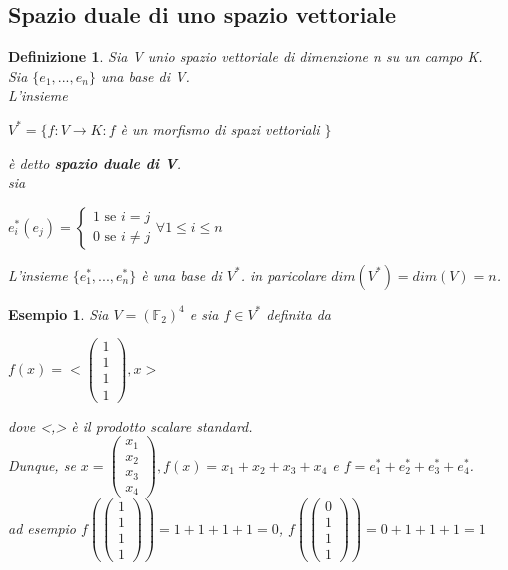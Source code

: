 \documentclass[a4paper,12pt]{article}
\theoremstyle{def}
\newtheorem*{definition}{Definizione}
\theoremstyle{prop}
\theoremstyle{esempio}
\newtheorem*{example}{Esempio}
\theoremstyle{dimostrazione}
\theoremstyle{teo}
\theoremstyle{osservazione}
\begin{document}
\newpage
\subsection{Spazio duale di uno spazio vettoriale}
\begin{definition}
	Sia V unio spazio vettoriale di dimenzione n su un campo K.\\
	Sia \(\{e_1, ..., e_n\}\) una base di V.\\
	L'insieme
	\begin{center}
		\(V^* = \{f : V \rightarrow K : f\) è un morfismo di spazi vettoriali \(\}\)\\
	\end{center}
	è detto \textbf{spazio duale di V}.\\
	sia
	\begin{center}
		\(e^*_i(e_j)= \begin{cases}
			1 \text{ se } i = j \\
			0 \text{ se } i \neq j
		\end{cases} \forall 1 \leq i \leq n\)
	\end{center}
	L'insieme \(\{e^*_1, ..., e^*_n\}\) è una base di \(V^*\). in paricolare \(dim(V^*) = dim(V) = n\).\\
\end{definition}

\begin{example}
	Sia \(V = (\mathbb{F}_2)^4\) e sia \(f \in V^*\) definita da
	\begin{center}
		\(f(x) = <\begin{pmatrix}
			1 \\
			1 \\
			1 \\
			1
		\end{pmatrix}, x >\)
	\end{center}
	dove <,> è il prodotto scalare standard.\\
	Dunque, se \(x = \begin{pmatrix}
		x_1 \\
		x_2 \\
		x_3 \\
		x_4
	\end{pmatrix}, f(x) = x_1 + x_2 + x_3 + x_4\) e \(f = e^*_1 + e^*_2 + e^*_3 + e^*_4\).\\
	ad esempio \(f(\begin{pmatrix}
		1 \\
		1 \\
		1 \\
		1
	\end{pmatrix}) = 1 + 1 + 1 + 1 = 0\),
	\(f(\begin{pmatrix}
		0 \\
		1 \\
		1 \\
		1
	\end{pmatrix}) = 0 + 1 + 1 + 1 = 1 \)
\end{example}
\end{document}
